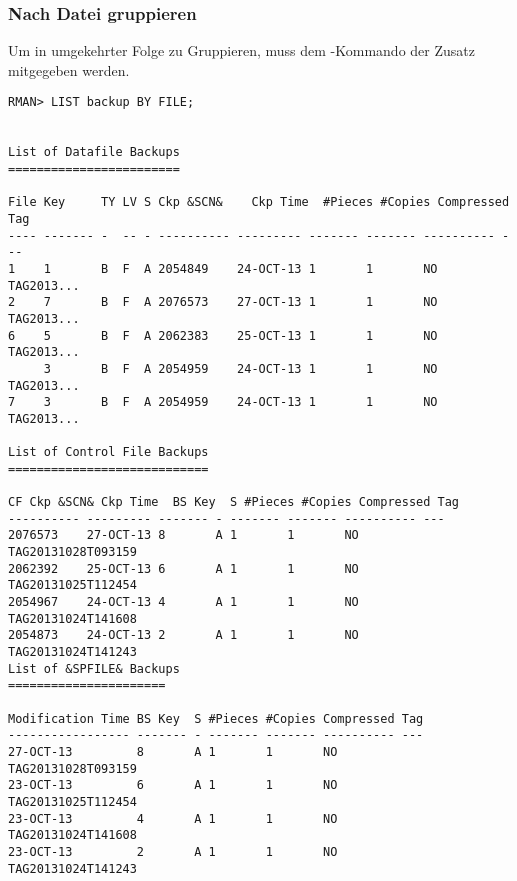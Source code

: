         \subsubsection{Nach Datei gruppieren}
          Um in umgekehrter Folge zu Gruppieren, muss dem
          -Kommando der Zusatz 
          mitgegeben werden.

          \begin{lstlisting}[caption={\languagerman{LIST} - Backups, gruppiert nach Backup Datei anzeigen},label=admin1349,language=rman]
RMAN> LIST backup BY FILE;


List of Datafile Backups
========================

File Key     TY LV S Ckp &SCN&    Ckp Time  #Pieces #Copies Compressed Tag
---- ------- -  -- - ---------- --------- ------- ------- ---------- ---
1    1       B  F  A 2054849    24-OCT-13 1       1       NO         TAG2013...
2    7       B  F  A 2076573    27-OCT-13 1       1       NO         TAG2013...
6    5       B  F  A 2062383    25-OCT-13 1       1       NO         TAG2013...
     3       B  F  A 2054959    24-OCT-13 1       1       NO         TAG2013...
7    3       B  F  A 2054959    24-OCT-13 1       1       NO         TAG2013...

List of Control File Backups
============================

CF Ckp &SCN& Ckp Time  BS Key  S #Pieces #Copies Compressed Tag
---------- --------- ------- - ------- ------- ---------- ---
2076573    27-OCT-13 8       A 1       1       NO         TAG20131028T093159
2062392    25-OCT-13 6       A 1       1       NO         TAG20131025T112454
2054967    24-OCT-13 4       A 1       1       NO         TAG20131024T141608
2054873    24-OCT-13 2       A 1       1       NO         TAG20131024T141243
List of &SPFILE& Backups
======================

Modification Time BS Key  S #Pieces #Copies Compressed Tag
----------------- ------- - ------- ------- ---------- ---
27-OCT-13         8       A 1       1       NO         TAG20131028T093159
23-OCT-13         6       A 1       1       NO         TAG20131025T112454
23-OCT-13         4       A 1       1       NO         TAG20131024T141608
23-OCT-13         2       A 1       1       NO         TAG20131024T141243
          \end{lstlisting}
